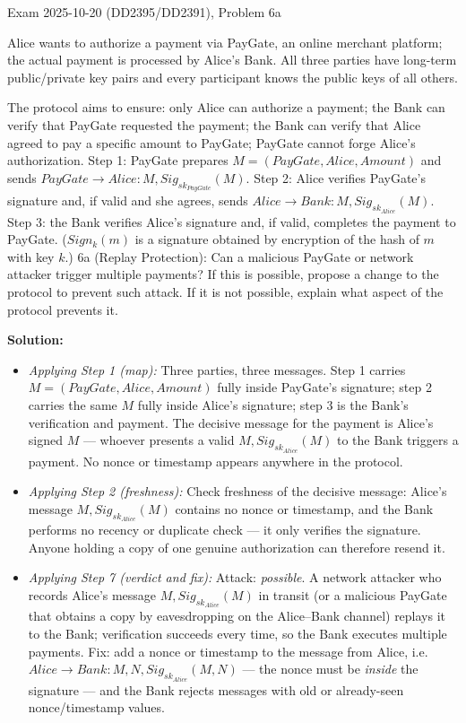 \documentclass[12pt, a4paper]{article}
\begin{document}
\begin{practicebox}{Exam 2025-10-20 (DD2395/DD2391), Problem 6a}
\begin{problembox}
Alice wants to authorize a payment via PayGate, an online merchant platform; the actual payment is processed by Alice's Bank. All three parties have long-term public/private key pairs and every participant knows the public keys of all others.

The protocol aims to ensure: only Alice can authorize a payment; the Bank can verify that PayGate requested the payment; the Bank can verify that Alice agreed to pay a specific amount to PayGate; PayGate cannot forge Alice's authorization.
Step 1: PayGate prepares $M = (PayGate, Alice, Amount)$ and sends $PayGate \to Alice : M, Sig_{sk_{PayGate}}(M)$.
Step 2: Alice verifies PayGate's signature and, if valid and she agrees, sends $Alice \to Bank : M, Sig_{sk_{Alice}}(M)$.
Step 3: the Bank verifies Alice's signature and, if valid, completes the payment to PayGate. ($Sign_k(m)$ is a signature obtained by encryption of the hash of $m$ with key $k$.) 6a (Replay Protection): Can a malicious PayGate or network attacker trigger multiple payments? If this is possible, propose a change to the protocol to prevent such attack. If it is not possible, explain what aspect of the protocol prevents it.
\end{problembox}

\textbf{Solution:}
\begin{itemize}
    \item \textit{Applying Step 1 (map):} Three parties, three messages. Step 1 carries $M = (PayGate, Alice, Amount)$ fully inside PayGate's signature; step 2 carries the same $M$ fully inside Alice's signature; step 3 is the Bank's verification and payment.
    The decisive message for the payment is Alice's signed $M$ --- whoever presents a valid $M, Sig_{sk_{Alice}}(M)$ to the Bank triggers a payment. No nonce or timestamp appears anywhere in the protocol.
    \item \textit{Applying Step 2 (freshness):} Check freshness of the decisive message: Alice's message $M, Sig_{sk_{Alice}}(M)$ contains no nonce or timestamp, and the Bank performs no recency or duplicate check --- it only verifies the signature. Anyone holding a copy of one genuine authorization can therefore resend it.
    \item \textit{Applying Step 7 (verdict and fix):} Attack: \emph{possible}. A network attacker who records Alice's message $M, Sig_{sk_{Alice}}(M)$ in transit (or a malicious PayGate that obtains a copy by eavesdropping on the Alice--Bank channel) replays it to the Bank;
    verification succeeds every time, so the Bank executes multiple payments. Fix: add a nonce or timestamp to the message from Alice, i.e. $Alice \to Bank : M, N, Sig_{sk_{Alice}}(M, N)$ --- the nonce must be \emph{inside} the signature --- and the Bank rejects messages with old or already-seen nonce/timestamp values.
\end{itemize}


\end{practicebox}
\end{document}
